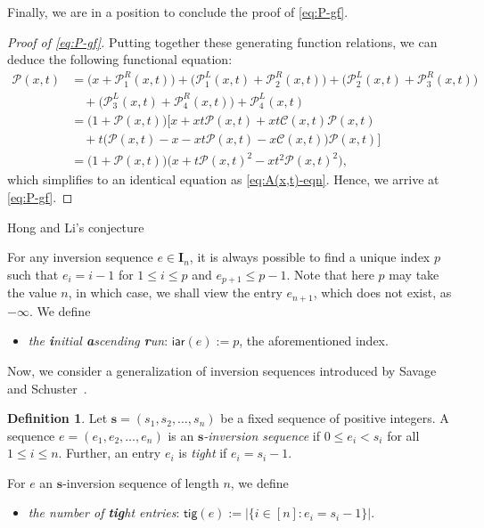 \documentclass[reqno]{amsart}
\makeatletter
\numberwithin{equation}{section}
\theoremstyle{plain}
\theoremstyle{definition}
\newtheorem{definition}{Definition}[section]
\theoremstyle{named}
\def\section{\@startsection{section}{1}
  \z@{.7\linespacing\@plus\linespacing}{.5\linespacing}

  {\normalfont\scshape}}
\newcommand{\bs}{\mathbf{s}}
\newcommand{\bI}{\mathbf{I}}
\newcommand{\iar}{\mathsf{iar}}
\newcommand{\tig}{\mathsf{tig}}
\newcommand{\cC}{\mathcal{C}}
\newcommand{\cP}{\mathcal{P}}
\makeatother
\begin{document}
Finally, we are in a position to conclude the proof of \eqref{eq:P-gf}.

\begin{proof}[Proof of \eqref{eq:P-gf}]
	Putting together these generating function relations, we can deduce the following functional equation:
	\begin{align*}
		\cP(x,t) &= \big(x+\cP_1^R(x,t)\big)+\big(\cP_1^L(x,t)+\cP_2^R(x,t)\big)+\big(\cP_2^L(x,t)+\cP_3^R(x,t)\big)\\
		&\quad+\big(\cP_3^L(x,t)+\cP_4^R(x,t)\big)+\cP_4^L(x,t)\\
		&= \big(1+\cP(x,t)\big)\big[x+xt \cP(x,t)+xt \cC(x,t)\cP(x,t)\\
		&\quad+t\big(\cP(x,t)-x-xt\cP(x,t)-x\cC(x,t)\big)\cP(x,t)\big]\\
		&= \big(1+\cP(x,t)\big)\big(x+t\cP(x,t)^2-xt^2\cP(x,t)^2\big),
	\end{align*}
	which simplifies to an identical equation as \eqref{eq:A(x,t)-eqn}. Hence, we arrive at \eqref{eq:P-gf}.
\end{proof}

\section{Hong and Li's conjecture}

For any inversion sequence $e\in\bI_n$, it is always possible to find a unique index $p$ such that $e_i=i-1$ for $1\le i\le p$ and $e_{p+1}\le p-1$. Note that here $p$ may take the value $n$, in which case, we shall view the entry $e_{n+1}$, which does not exist, as $-\infty$. We define
\begin{itemize}[leftmargin=*,align=left]
	\renewcommand{\labelitemi}{$\triangleright$}
	\item \textit{the \textbf{i}nitial \textbf{a}scending \textbf{r}un}: $\iar(e):=p$, the aforementioned index.
\end{itemize}

Now, we consider a generalization of  inversion sequences introduced by Savage and  Schuster~\cite{SS2012}.

\begin{definition}
	Let $\bs=(s_1,s_2,\ldots,s_n)$ be a fixed sequence of positive integers. A sequence $e=(e_1,e_2,\ldots,e_n)$ is an \textit{$\bs$-inversion sequence} if $0\le e_i<s_i$ for all $1\le i\le n$. Further, an entry $e_i$ is \textit{tight} if $e_i=s_i-1$.
\end{definition}

For $e$ an $\bs$-inversion sequence of length $n$, we define
\begin{itemize}[leftmargin=*,align=left]
	\renewcommand{\labelitemi}{$\triangleright$}
	\item \textit{the number of \textbf{tig}ht entries}: $\tig(e):=|\{i\in[n]:e_i=s_i-1\}|$.
\end{itemize}
\end{document}
